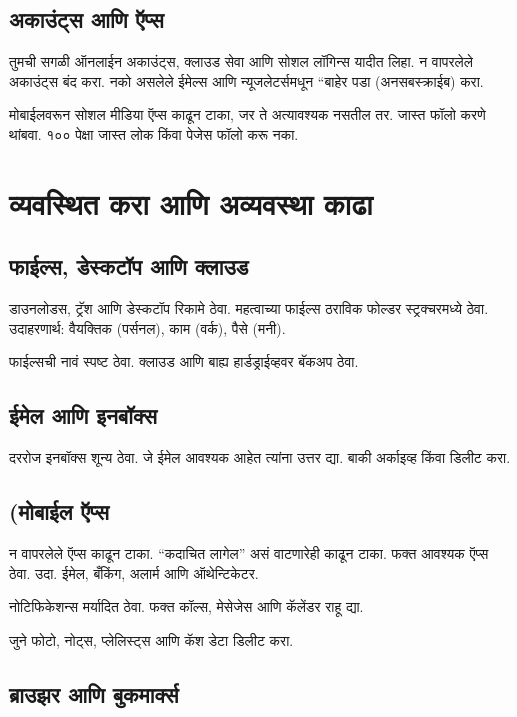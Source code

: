 \subsection*{अकाउंट्स आणि ऍप्स}

तुमची सगळी ऑनलाईन अकाउंट्स, क्लाउड सेवा आणि सोशल लॉगिन्स यादीत लिहा. न वापरलेले अकाउंट्स बंद करा. नको असलेले ईमेल्स आणि न्यूजलेटर्समधून “बाहेर पडा  (अनसबस्क्राईब) करा.

मोबाईलवरून सोशल मीडिया ऍप्स काढून टाका, जर ते अत्यावश्यक नसतील तर. जास्त फॉलो करणे थांबवा.
१०० पेक्षा जास्त लोक किंवा पेजेस फॉलो करू नका.

\section*{व्यवस्थित करा आणि अव्यवस्था काढा}

\subsection*{फाईल्स, डेस्कटॉप आणि क्लाउड}

डाउनलोडस, ट्रॅश आणि डेस्कटॉप रिकामे ठेवा. महत्वाच्या फाईल्स ठराविक फोल्डर स्ट्रक्चरमध्ये ठेवा.
उदाहरणार्थ:  वैयक्तिक (पर्सनल), काम (वर्क), पैसे (मनी). 

फाईल्सची नावं स्पष्ट ठेवा. क्लाउड आणि बाह्य हार्डड्राईव्हवर बॅकअप ठेवा.

\subsection*{ईमेल आणि इनबॉक्स}

दररोज इनबॉक्स शून्य ठेवा. जे ईमेल आवश्यक आहेत त्यांना उत्तर द्या. बाकी अर्काइव्ह किंवा डिलीट करा.

\subsection*{(मोबाईल ऍप्स }

न वापरलेले ऍप्स काढून टाका. “कदाचित लागेल” असं वाटणारेही काढून टाका. फक्त आवश्यक ऍप्स ठेवा. उदा. ईमेल, बँकिंग, अलार्म आणि ऑथेन्टिकेटर.

नोटिफिकेशन्स मर्यादित ठेवा. फक्त कॉल्स, मेसेजेस आणि कॅलेंडर राहू द्या.

जुने फोटो, नोट्स, प्लेलिस्ट्स आणि कॅश डेटा डिलीट करा.

\subsection*{ ब्राउझर आणि बुकमार्क्स}

